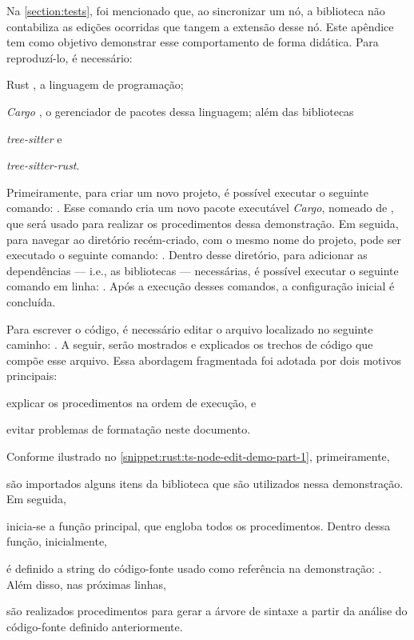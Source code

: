 \documentclass
  [11pt,a4paper,english,brazil,openright,sumario=tradicional,twoside]
  {abntex2}
\begin{document}
\begin{apendicesenv}
{{    Na \cref{section:tests}, foi mencionado que, ao sincronizar um nó, a
    biblioteca \treesitter não contabiliza as edições ocorridas que tangem a
    extensão desse nó. Este apêndice tem como objetivo demonstrar esse
    comportamento de forma didática. Para reproduzí-lo, é necessário:
    \begin{inparaenum}
      \item Rust \cite{rust-2023-rust}, a linguagem de programação;
      \item \textit{Cargo} \cite{rust-2023-cargo}, o gerenciador de pacotes
            dessa linguagem; além das bibliotecas
      \item \textit{tree-sitter} e
      \item \textit{tree-sitter-rust}.
    \end{inparaenum}

    Primeiramente, para criar um novo projeto, é possível executar o seguinte
    comando: . Esse comando cria
    um novo pacote executável \textit{Cargo}, nomeado de
    , que será usado para realizar os
    procedimentos dessa demonstração. Em seguida, para navegar ao diretório
    recém-criado, com o mesmo nome do projeto, pode ser executado o seguinte
    comando: . Dentro desse diretório,
    para adicionar as dependências --- i.e., as bibliotecas --- necessárias, é
    possível executar o seguinte comando em linha:
    . Após a execução
    desses comandos, a configuração inicial é concluída.

    Para escrever o código, é necessário editar o arquivo localizado no
    seguinte caminho: . A seguir, serão
    mostrados e explicados os trechos de código que compõe esse arquivo. Essa
    abordagem fragmentada foi adotada por dois motivos principais:
    \begin{inparaenum}
      \item explicar os procedimentos na ordem de execução, e
      \item evitar problemas de formatação neste documento.
    \end{inparaenum}

    Conforme ilustrado no \cref{snippet:rust:ts-node-edit-demo-part-1},
    primeiramente,
    \begin{inparaenum}
      \item são importados alguns itens da biblioteca \treesitter que são
            utilizados nessa demonstração. Em seguida,
      \item inicia-se a função principal, que engloba todos os procedimentos.
            Dentro dessa função, inicialmente,
      \item é definido a string do código-fonte usado como referência na
            demonstração: . Além disso,
            nas próximas linhas,
      \item são realizados procedimentos para gerar a árvore de sintaxe a
            partir da análise do código-fonte definido anteriormente.
    \end{inparaenum}

}}
\end{apendicesenv}
\end{document}
